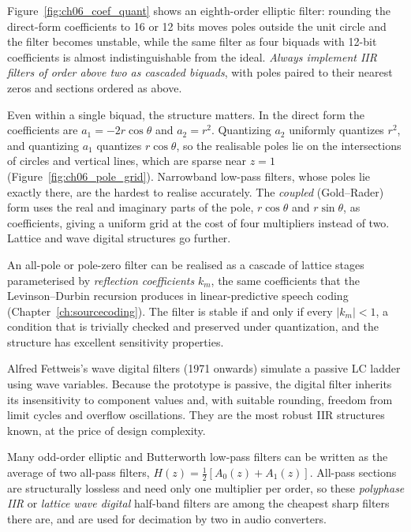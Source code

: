 Figure~\ref{fig:ch06_coef_quant} shows an eighth-order elliptic filter: rounding the direct-form
coefficients to 16 or 12 bits moves poles outside the unit circle and the filter becomes unstable,
while the same filter as four biquads with 12-bit coefficients is almost indistinguishable from the
ideal. \emph{Always implement IIR filters of order above two as cascaded biquads}, with poles paired
to their nearest zeros and sections ordered as above.

Even within a single biquad, the structure matters. In the direct form the coefficients are
$a_1=-2r\cos\theta$ and $a_2=r^2$. Quantizing $a_2$ uniformly quantizes $r^2$, and quantizing $a_1$
quantizes $r\cos\theta$, so the realisable poles lie on the intersections of circles and vertical
lines, which are sparse near $z=1$ (Figure~\ref{fig:ch06_pole_grid}). Narrowband low-pass filters,
whose poles lie exactly there, are the hardest to realise accurately. The \emph{coupled} (Gold--Rader)
form uses the real and imaginary parts of the pole, $r\cos\theta$ and $r\sin\theta$, as coefficients,
giving a uniform grid at the cost of four multipliers instead of two. Lattice and wave digital
structures go further.


\begin{description}[style=nextline,leftmargin=1.2em,font=\sffamily\bfseries\small\color{navy}]
\item[Lattice filters.] An all-pole or pole-zero filter can be realised as a cascade of lattice
stages parameterised by \emph{reflection coefficients} $k_m$, the same coefficients that the
Levinson--Durbin recursion produces in linear-predictive speech coding (Chapter~\ref{ch:sourcecoding}).
The filter is stable if and only if every $|k_m|<1$, a condition that is trivially checked and
preserved under quantization, and the structure has excellent sensitivity properties.
\item[Wave digital filters.] Alfred Fettweis's wave digital filters (1971 onwards) simulate a
passive LC ladder using wave variables. Because the prototype is passive, the digital filter
inherits its insensitivity to component values and, with suitable rounding, freedom from limit
cycles and overflow oscillations. They are the most robust IIR structures known, at the price of
design complexity.
\item[All-pass decompositions.] Many odd-order elliptic and Butterworth low-pass filters can be
written as the average of two all-pass filters, $H(z)=\tfrac12[A_0(z)+A_1(z)]$. All-pass sections
are structurally lossless and need only one multiplier per order, so these
\emph{polyphase IIR} or \emph{lattice wave digital} half-band filters are among the cheapest
sharp filters there are, and are used for decimation by two in audio converters.
\end{description}

